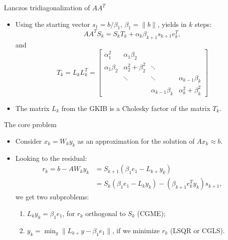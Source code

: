 \documentclass{beamer}
\begin{document}
\begin{frame}{Lanczos tridiagonalization of $AA^{T}$}
  \begin{itemize}
    \item Using the starting vector $s_{1} = b/\beta_{1}$, $\beta_{1} = \|b\|$,
      yields in $k$ steps:
      \begin{equation*}
	AA^{T}S_{k} = S_{k}T_{k} + \alpha_{k}\beta_{k+1}s_{k+1}e_{k}^{T},
      \end{equation*}
      and
      \begin{equation*}
	T_{k} = L_{k}L_{k}^{T} = 
	\begin{bmatrix}
	  \alpha_{1}^{2} & \alpha_{1}\beta_{2} & & \\
	  \alpha_{1}\beta_{2} & \alpha_{2}^{2} + \beta_{2}^{2} & \ddots & \\
	  & \ddots & \ddots & \alpha_{k-1}\beta_{k} \\
	  & & \alpha_{k-1}\beta_{k} & \alpha_{k}^{2} + \beta_{k}^{2}
	\end{bmatrix}
      \end{equation*}
      
    \item The matrix $L_{k}$ from the GKIB is a Cholesky factor of the matrix
      $T_{k}$.
  \end{itemize}
\end{frame}

\begin{frame}{The core problem}
  \begin{itemize}
    \item Consider $x_{k} = W_{k}y_{k}$ as an approximation for the solution of
      $Ax_{k} \approx b$.

    \item Looking to the residual:
      \begin{align*}
	r_{k} = b - AW_{k}y_{k} &= S_{k+1}(\beta_{1}e_{1} - L_{k+}y_{k}) \\
	&= S_{k}(\beta_{1}e_{1} - L_{k}y_{k}) - 
	(\beta_{k+1}e_{k}^{T}y_{k})s_{k+1},
      \end{align*}
      we get two subproblems:
      \begin{enumerate}
        \item $L_{k}y_{k} = \beta_{1}e_{1}$, for $r_{k}$ orthogonal to $S_{k}$
	  (CGME);
        \item $y_{k} = \min_{y}\|L_{k+}y - \beta_{1}e_{1}\|$, if we minimize 
	  $r_k$ (LSQR or CGLS).
      \end{enumerate}
  \end{itemize}
\end{frame}
\end{document}
